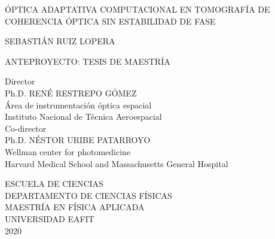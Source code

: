 \documentclass[letter, 12 pt]{article}
\begin{document}
\setlength\parindent{0pt}
\renewcommand{\contentsname}{Contenido}	%
\renewcommand{\listtablename}{Índice de tablas}
\renewcommand{\tablename}{Tabla}	%
\renewcommand{\refname}{REFERENCIAS}

\sectionfont{\fontsize{12}{1}\selectfont\centering}
\subsectionfont{\fontsize{12}{1}\selectfont}
\thispagestyle{empty}

\begin{center}

 
ÓPTICA ADAPTATIVA COMPUTACIONAL EN TOMOGRAFÍA DE COHERENCIA ÓPTICA SIN ESTABILIDAD DE FASE
\vfill

SEBASTIÁN RUIZ LOPERA
\vfill

ANTEPROYECTO: TESIS DE MAESTRÍA
\vfill

Director \\
Ph.D. RENÉ RESTREPO GÓMEZ \\
Área de instrumentación óptica espacial \\
Instituto Nacional de Técnica Aeroespacial \\
\vspace{\baselineskip}
Co-director \\
Ph.D. NÉSTOR URIBE PATARROYO \\
Wellman center for photomedicine \\
Harvard Medical School and Massachusetts General Hospital \\
\vfill

ESCUELA DE CIENCIAS \\
DEPARTAMENTO DE CIENCIAS FÍSICAS \\
MAESTRÍA EN FÍSICA APLICADA \\ 
UNIVERSIDAD EAFIT \\
2020
\end{center}

\thispagestyle{empty}
\newpage


\leavevmode\thispagestyle{empty}\newpage
\addtocounter{page}{-1}%
\renewcommand{\contentsname}{CONTENIDO}
\tableofcontents
\newpage
\setcounter{page}{3}

\end{document}
